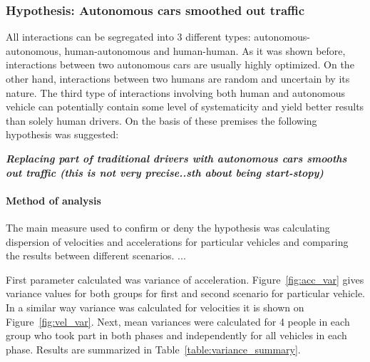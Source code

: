 \documentclass[11pt,english]{article}
\begin{document}
\subsubsection{Hypothesis: Autonomous cars smoothed out traffic}

All interactions can be segregated into 3 different types: autonomous-autonomous, human-autonomous and human-human. As it was shown before, interactions between two autonomous cars are usually highly optimized. On the other hand, interactions between two humans are random and uncertain by its nature. The third type of interactions involving both human and autonomous vehicle can potentially contain some level of systematicity and yield better results than solely human drivers. On the basis of these premises the following hypothesis was suggested:

\textbf{\textit{Replacing part of traditional drivers with autonomous cars smooths out traffic (this is not very precise..sth about being start-stopy)}}

\paragraph{Method of analysis}
The main measure used to confirm or deny the hypothesis was calculating dispersion of velocities and accelerations for particular vehicles and comparing the results between different scenarios. ...\citep{dixon1957introduction}

First parameter calculated was variance of acceleration. Figure~\ref{fig:acc_var} gives variance values for both groups for first and second scenario for particular vehicle. In a similar way variance was calculated for velocities it is shown on Figure~\ref{fig:vel_var}. Next, mean variances were calculated for 4 people in each group who took part in both phases and independently for all vehicles in each phase. Results are summarized in Table~\ref{table:variance_summary}. 
 
\end{document}
